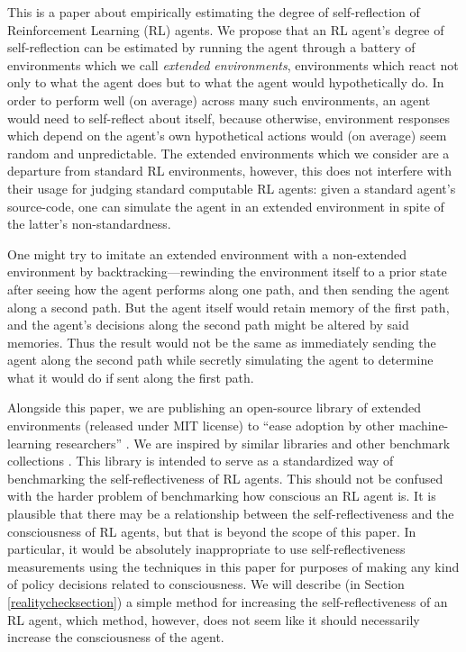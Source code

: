 \documentclass{article}
\begin{document}
This is a paper about empirically estimating the degree of self-reflection of
Reinforcement Learning (RL) agents. We propose that an RL agent's degree of self-reflection
can be estimated by running the agent through a battery of environments which we call
\emph{extended environments}, environments which react not only to what the agent does
but to what the agent would hypothetically do. In order to perform well (on average)
across many such environments, an agent would need to self-reflect about itself, because
otherwise, environment responses which depend on the agent's own hypothetical actions
would (on average) seem random and unpredictable. The extended environments which we
consider are a departure from standard RL environments, however, this does not interfere
with their usage for judging standard computable RL agents: given a standard agent's
source-code, one can simulate the agent in an extended environment in spite of the
latter's non-standardness.

One might try to imitate an extended environment with a non-extended environment by
backtracking---rewinding the environment itself to a prior state after seeing how the
agent performs along one path, and then sending the agent along a second path.
But the agent itself would retain memory of the first path, and the agent's decisions
along the second path might be altered by said memories. Thus the result would not be
the same as immediately sending the agent along the second path while secretly simulating
the agent to determine what it would do if sent along the first path.

Alongside this paper, we are publishing an open-source library \cite{library} of extended
environments (released under MIT license)
to ``ease adoption by other machine-learning researchers''
\cite{sonnenburg2007need}.
We are
inspired by similar libraries and other benchmark collections
\cite{bellemare2013arcade}
\cite{beyret2019animal} \cite{brockman2016openai} \cite{chollet2019measure}
\cite{cobbe2020leveraging}
\cite{hendrycks2019benchmarking}
\cite{yampolskiy2017detecting}.
This library is intended to serve as a standardized way of
benchmarking the self-reflectiveness of RL agents. This should not be confused
with the harder problem of benchmarking how conscious an RL agent is. It is
plausible that there may be a relationship between the self-reflectiveness and
the consciousness of RL agents, but that is beyond the scope of this paper.
In particular, it would be absolutely inappropriate to use self-reflectiveness
measurements using the techniques in this paper for purposes of making any kind
of policy decisions related to consciousness.
We will describe (in Section \ref{realitychecksection})
a simple method for increasing the self-reflectiveness of an RL agent, which method,
however, does not seem like it should necessarily increase the consciousness of
the agent.
\end{document}

